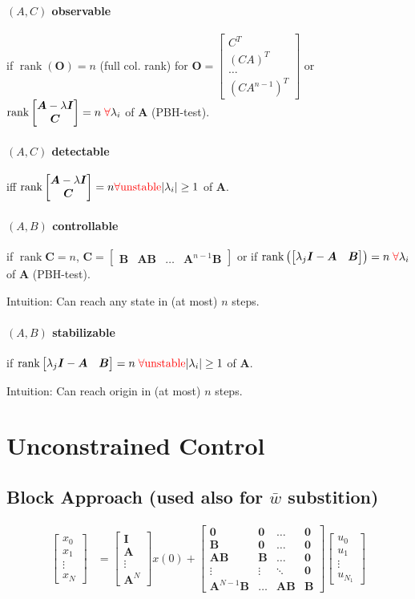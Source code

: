 \documentclass[landscape,a4paper,8pt]{scrartcl}
\newcommand{\remph}[1]{{\textcolor{red}{#1}}}
\newcommand\vA{\bm{A}}
\newcommand\vB{\bm{B}}
\newcommand\vC{\bm{C}}
\newcommand\vI{\bm{I}}
\newcommand\vO{\bm{O}}
\newcommand{\Me}[1]{\begin{bmatrix}#1\end{bmatrix}} %
\DeclareMathOperator\rank{rank}
\begin{document}
\begin{multicols*}{3}
\paragraph{$(A,C)$ observable}
if $\rank(\vO) = n$ (full col. rank) for
$\vO = \Me{C^T \\ (CA)^T \\ \dots \\ (CA^{n-1})^T}$ or $\rank\Me{\vA-\lambda\vI \\ \vC} = n \; \remph{\forall} \lambda_i$ of $\vA$ (PBH-test).
\paragraph{$(A,C)$ detectable}
iff $\rank\Me{\vA-\lambda\vI \\ \vC} = n \remph{\forall \text{unstable}} |\lambda_i| \geq 1$ of $\vA$.

\paragraph{$(A,B)$ controllable}
if $\rank\vC = n$,
$\vC = \Me{\vB & \vA\vB & \dots & \vA^{n-1}\vB}$
or
if $\rank\left(\Me{\lambda_j \vI - \vA & \vB}\right) = n\; \remph{\forall} \lambda_i$ of $\vA$ (PBH-test).

Intuition: Can reach any state in (at most) $n$ steps.

\paragraph{$(A,B)$ stabilizable}
if $\rank\Me{\lambda_j \vI - \vA & \vB} = n \; \remph{\forall \text{unstable}} |\lambda_i| \geq 1$ of $\vA$.

Intuition: Can reach origin in (at most) $n$ steps.

\section{Unconstrained Control}
\subsection{Block Approach (used also for $\bar w$ substition)}
\begin{align*}
		\Me{x_0 \\ x_1 \\ \vdots \\ x_N } & = \Me{\vI \\ \vA \\ \vdots \\ \vA^N}x(0) + \Me{\bm 0 & \bm 0 & \dots & \bm 0 \\ \vB & \bm 0 & \dots & \bm 0 \\ \vA\vB & \vB & \dots & \bm 0 \\ \vdots & \vdots & \ddots & \bm 0 \\ \vA^{N-1}\vB & \dots & \vA\vB & \vB}\Me{u_0 \\ u_1 \\ \vdots \\ u_{N_1}}
\end{align*}


\end{multicols*}
\end{document}
